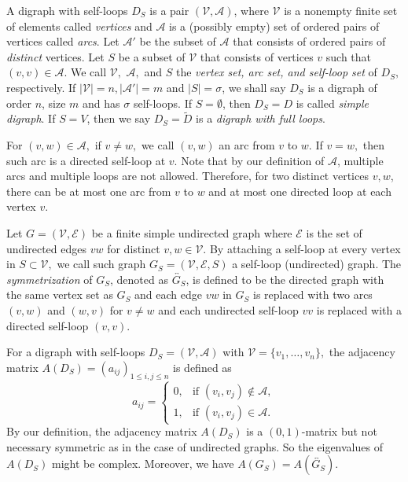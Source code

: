 \documentclass[12pt,a4paper,reqno]{amsart}
\numberwithin{equation}{section}
\theoremstyle{plain}
\theoremstyle{definition}
\newcommand{\<}{\langle}
\renewcommand{\>}{\rangle}
\newcommand{\cA}{{\mathcal A}}
\newcommand{\cE}{{\mathcal E}}
\newcommand{\cV}{{\mathcal V}}
\begin{document}
    A digraph with self-loops $D_S$ is a pair $(\cV,\cA)$, where $\cV$ is a nonempty finite set of elements called \textit{vertices} and $\cA$ is a (possibly empty) set of ordered pairs of vertices called \textit{arcs}. Let $\cA'$ be the subset of $\cA$ that consists of ordered pairs of \textit{distinct} vertices. Let $S$ be a subset of $\cV$ that consists of vertices $v$ such that $(v,v)\in \cA$. We call $\cV,$ $\cA,$ and $S$ the \textit{vertex set, arc set, and self-loop set} of $D_S,$ respectively.  If $|\cV|=n, |\cA'|=m$ and $|S|=\sigma$, we shall say $D_S$ is a digraph of order $n$, size $m$ and has $\sigma$ self-loops. If $S= \emptyset$, then $D_S=D$ is called \textit{simple digraph}. If $S=V$, then we say $D_S=\widetilde{D}$ is a \textit{digraph with full loops}.
    
    For $(v,w)\in \cA,$ if $v \neq w,$ we call $(v,w)$ an arc from $v$ to $w.$ If $v = w,$ then such arc is a directed self-loop at $v$. Note that by our definition of $\cA$, multiple arcs and multiple loops are not allowed. Therefore, for two distinct vertices $v,w$, there can be at most one arc from $v$ to $w$ and at most one directed loop at each vertex $v$.

    Let $G=(\cV,\cE)$ be a finite simple undirected graph where $\cE$ is the set of undirected edges $vw$ for distinct $v,w \in \cV.$ By attaching a self-loop at every vertex in $S \subset \cV,$ we call such graph $G_S=(\cV,\cE, S)$ a self-loop (undirected) graph.  The \textit{symmetrization} of $G_S$, denoted as $\overleftrightarrow{G_S}$, is defined to be the directed graph with the same vertex set as $G_S$ and each edge $vw$ in $G_S$ is replaced with two arcs $(v,w)$ and $(w,v)$ for $v \neq w$ and each undirected self-loop $vv$ is replaced with a directed self-loop $(v,v)$.  
    
    For a digraph with self-loops $D_S=(\cV,\cA)$ with $\cV=\{v_1, \ldots, v_n\},$ the adjacency matrix $A(D_S)=(a_{ij})_{1 \leq i,j \leq n}$ is defined as
    \[
    a_{ij}=
    \begin{cases}
	0, &\text{if } (v_i,v_j) \notin \cA,\\
	1, &\text{if } (v_i,v_j) \in \cA.
    \end{cases}
    \]
    By our definition, the adjacency matrix $A(D_S)$ is a $(0,1)$-matrix but not necessary symmetric as in the case of undirected graphs. So the eigenvalues of $A(D_S)$ might be complex. Moreover, we have $A(G_S)=A(\overleftrightarrow{G_S})$.
\end{document}
